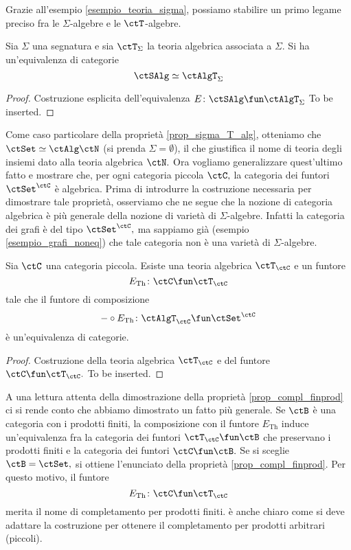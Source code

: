 Grazie all'esempio \ref{esempio_teoria_sigma}, possiamo stabilire un primo legame preciso fra le $\Sigma$-algebre e le $\ctT$-algebre.

\begin{proposition}\label{prop_sigma_T_alg}
Sia $\Sigma$ una segnatura e sia $\ctT_{\Sigma}$ la teoria algebrica associata a $\Sigma.$ Si ha un'equivalenza di categorie
$$\ctSAlg \simeq \ctAlgT_{\Sigma}$$
\end{proposition}

\begin{proof}
Costruzione esplicita dell'equivalenza $E \colon \ctSAlg \fun \ctAlgT_{\Sigma}$ To be inserted.
\end{proof} 

Come caso particolare della proprietà \ref{prop_sigma_T_alg}, otteniamo che $\ctSet \simeq \ctAlg\ctN$ (si prenda $\Sigma = \emptyset$),
il che giustifica il nome di teoria degli insiemi dato alla teoria algebrica $\ctN.$ Ora vogliamo generalizzare quest'ultimo fatto e mostrare che, 
per ogni categoria piccola $\ctC,$ la categoria dei funtori $\ctSet^{\ctC}$ è algebrica. Prima di introdurre la costruzione necessaria per 
dimostrare tale proprietà, osserviamo che ne segue che la nozione di categoria algebrica è più generale della nozione di varietà di 
$\Sigma$-algebre. Infatti la categoria dei grafi è del tipo $\ctSet^{\ctC},$ ma sappiamo già (esempio \ref{esempio_grafi_noneq}) che tale 
categoria non è una varietà di $\Sigma$-algebre.

\begin{proposition}\label{prop_compl_finprod}
Sia $\ctC$ una categoria piccola. Esiste una teoria algebrica $\ctT_{\ctC}$ e un funtore
$$E_{\mathrm{Th}} \colon \ctC \fun \ctT_{\ctC}$$
tale che il funtore di composizione
$$- \circ E_{\mathrm{Th}} \colon \ctAlgT_{\ctC} \fun \ctSet^{\ctC}$$
è un'equivalenza di categorie.
\end{proposition}

\begin{proof}
Costruzione della teoria algebrica $\ctT_{\ctC}$ e del funtore $\ctC \fun \ctT_{\ctC}.$ To be inserted.
\end{proof}

\begin{remark}\label{oss_compl_finprod}
A una lettura attenta della dimostrazione della proprietà \ref{prop_compl_finprod} ci si rende conto che abbiamo dimostrato un fatto più 
generale. Se $\ctB$ è una categoria con i prodotti finiti, la composizione con il funtore $E_{\mathrm{Th}}$ induce un'equivalenza fra la 
categoria dei funtori $\ctT_{\ctC} \fun \ctB$ che preservano i prodotti finiti e la categoria dei funtori $\ctC \fun \ctB.$ Se si sceglie 
$\ctB = \ctSet,$ si ottiene l'enunciato della proprietà \ref{prop_compl_finprod}. Per questo motivo, il funtore 
$$E_{\mathrm{Th}} \colon \ctC \fun \ctT_{\ctC}$$
merita il nome di completamento per prodotti finiti. è anche chiaro come si deve adattare la costruzione per ottenere il completamento per
prodotti arbitrari (piccoli).
\end{remark}


